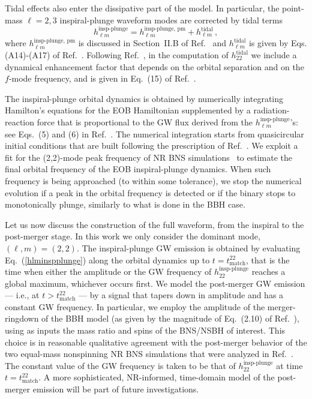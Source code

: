 \documentclass[prd,aps,letter,twocolumn,floatfix,notitlepage]{revtex4-1}
\begin{document}
Tidal effects also enter the dissipative part of the model. In particular, the point-mass $\ell=2,3$ inspiral-plunge waveform modes are corrected by tidal terms
\begin{equation}
h_{\ell m}^{\textrm{insp-plunge}} = h_{\ell m}^{\textrm{insp-plunge, pm}} + h_{\ell m}^{\textrm{tidal}}\,,\label{hlminspplunge}
\end{equation} 
where $h_{\ell m}^{\textrm{insp-plunge, pm}}$ is discussed in Section~II.B of Ref.~\cite{Bohe:2016gbl} and $h_{\ell m}^{\textrm{tidal}}$ is given by Eqs. (A14)-(A17) of Ref.~\cite{Damour:2012yf}. Following Ref.~\cite{Dietrich:2017feu}, in the computation of $h_{22}^{\textrm{tidal}}$ we include a dynamical enhancement factor that depends on the orbital separation and on the $f$-mode frequency, and is given in Eq.~(15) of Ref.~\cite{Dietrich:2017feu}.

The inspiral-plunge orbital dynamics is obtained by numerically integrating Hamilton's equations for the EOB Hamiltonian supplemented by a radiation-reaction force that is proportional to the GW flux derived from the $h_{\ell m}^{\textrm{insp-plunge}}$'s: see Eqs.~(5) and (6) in Ref.~\cite{Dietrich:2017feu}. The numerical integration starts from quasicircular initial conditions that are built following the prescription of Ref.~\cite{Buonanno:2005xu}. We exploit a fit for the (2,2)-mode peak frequency of NR BNS simulations~\cite{Bernuzzi:2015rla} to estimate the final orbital frequency of the EOB inspiral-plunge dynamics. When such frequency is being approached (to within some tolerance), we stop the numerical evolution if a peak in the orbital frequency is detected or if the binary stops to monotonically plunge, similarly to what is done in the BBH case. 

Let us now discuss the construction of the full waveform, from the inspiral to the post-merger stage. In this work we only consider the dominant mode, $(\ell,m)=(2,2)$. The inspiral-plunge GW emission is obtained by evaluating Eq.~(\ref{hlminspplunge}) along the orbital dynamics up to $t=t_{\textrm{match}}^{22}$, that is the time when either the amplitude or the GW frequency of $h_{22}^{\textrm{insp-plunge}}$ reaches a global maximum, whichever occurs first. We model the post-merger GW emission --- i.e., at $t>t_{\textrm{match}}^{22}$ --- by a signal that tapers down in amplitude and has a constant GW frequency. In particular, we employ the amplitude of the merger-ringdown of the BBH model (as given by the magnitude of Eq.~(2.10) of Ref.~\cite{Bohe:2016gbl}), using as inputs the mass ratio and spins of the BNS/NSBH of interest. This choice is in reasonable qualitative agreement with the post-merger behavior of the two equal-mass nonspinning NR BNS simulations that were analyzed in Ref.~\cite{Hinderer:2016eia}. The constant value of the GW frequency is taken to be that of $h_{22}^{\textrm{insp-plunge}}$ at time $t=t_{\textrm{match}}^{22}$. A more sophisticated, NR-informed, time-domain model of the post-merger emission will be part of future investigations. 
\end{document}
